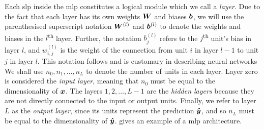 \documentclass[../report.tex]{subfiles}
\begin{document}
Each \gls{slp} inside the \gls{mlp} constitutes a logical module which we call a \emph{layer}.
Due to the fact that each layer has its own weights ${\bm{W}}$ and biases ${\bm{b}}$, we will use the parenthesised superscript notation ${\bm{W}}^{(l)}$ and ${\bm{b}}^{(l)}$ to denote the weights and biases in the $l$\textsuperscript{th} layer.
Further, the notation $b_j^{(l)}$ refers to the $j$\textsuperscript{th} unit's bias in layer $l$, and $w_{i,j}^{(l)}$ is the weight of the connection from unit $i$ in layer $l-1$ to unit $j$ in layer $l$.
This notation follows \textcite{goodfellow2016} and is customary in describing neural networks
We shall use $n_0,n_1,\dots,n_L$ to denote the number of units in each layer.
Layer zero is considered the \emph{input layer}, meaning that $n_0$ must be equal to the dimensionality of ${\bm{x}}$. 
The layers $1, 2, \dots, L-1$ are the \emph{hidden layers} because they are not directly connected to the input or output units.
Finally, we refer to layer $L$ as the \emph{output layer}, since its units represent the prediction ${\bm{\hat{y}}}$, and so $n_L$ must be equal to the dimensionality of ${\bm{\hat{y}}}$. 
 gives an example of a \gls{mlp} architecture.
\end{document}
